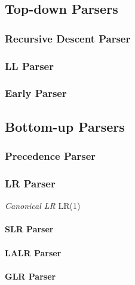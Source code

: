 \subsection{Top-down Parsers}

\subsubsection{Recursive Descent Parser}

\subsubsection{LL Parser}

\subsubsection{Early Parser}



\subsection{Bottom-up Parsers}

\subsubsection{Precedence Parser}

\subsubsection{LR Parser}

\emph{Canonical LR} LR(1)

\paragraph{SLR Parser}

\paragraph{LALR Parser}

\paragraph{GLR Parser}

